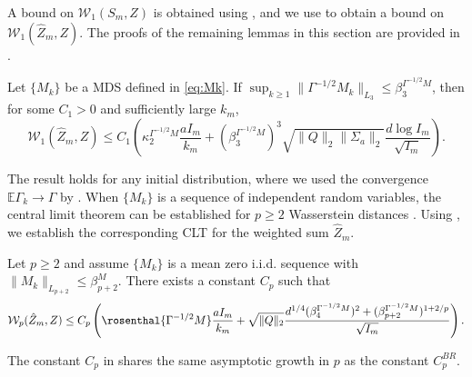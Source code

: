 \documentclass[11pt]{article}
\begin{document}
A bound on $\mathcal{W}_1(S_m, Z)$ is obtained using \citep[Theorem 1]{srikant2024CLT}, and we use  to obtain a bound on $\mathcal{W}_1(\hat{Z}_m, Z)$.
The proofs of the remaining lemmas in this section are provided in .
\begin{lemma}\label{lem:martingale_clt}
    Let $\{M_k\}$ be a MDS defined in \eqref{eq:Mk}.
    If $\sup_{k \geq 1} \lVert \Gamma^{-1/2} M_k \rVert_{L_3} \leq \beta_3^{\Gamma^{-1/2} M}$, then for some $C_1 > 0$ and sufficiently large $k_m$,
    \begin{equation*}
    \mathcal{W}_1 (\hat{Z}_m, Z) 
        \leq
    C_1 
    \left(\kappa_2^{\Gamma^{-1/2}M} \frac{a I_m}{k_m} 
    +
    \left(\beta_3^{\Gamma^{-1/2} M} \right)^3 \sqrt{\lVert Q \rVert_2 \lVert \Sigma_a \rVert_2} \frac{d \log I_m}{\sqrt{I_m}}
    \right) .
    \end{equation*}
\end{lemma}
The result holds for any initial distribution, where we used the convergence $\mathbb{E} \Gamma_k \to \Gamma$ by .
When $\{M_k\}$ is a sequence of independent random variables, the central limit theorem can be established for $p \geq 2$ Wasserstein distances \citep{bonis2020steinsmethodnormalapproximation}. 
Using , we establish the corresponding CLT for the weighted sum $\hat{Z}_m$.
\begin{lemma}\label{lem:bonis_weighted}
    Let $p \geq 2$ and assume $\{M_k\}$ is a mean zero i.i.d. sequence with $\lVert M_k \rVert_{L_{p+2}} \leq \beta_{p+2}^M$. 
    There exists a constant $C_p$ such that 
    \begin{equation*}
        \mathcal{W}_p (\hat{Z}_m, Z) 
        \leq 
         C_p \left(\rosenthal{\Gamma^{-1/2}M}  \frac{a I_m}{k_m} 
+
    \sqrt{\lVert Q \rVert_2}\frac{d^{1/4} (\beta_4^{\Gamma^{-1/2}M})^2 + (\beta_{p+2}^{\Gamma^{-1/2}M})^{1+2/p} }{\sqrt{I_m}}
     \right)
. 
    \end{equation*}
\end{lemma}
The constant $C_p$ in  shares the same asymptotic growth in $p$ as the constant $C_p^{BR}$. 
\end{document}
